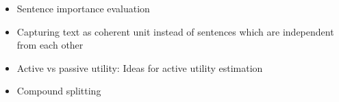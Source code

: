 
\begin{itemize}
    \item Sentence importance evaluation
    \item Capturing text as coherent unit instead of sentences which are independent from each other
    \item Active vs passive utility: Ideas for active utility estimation
    \item Compound splitting
\end{itemize}
